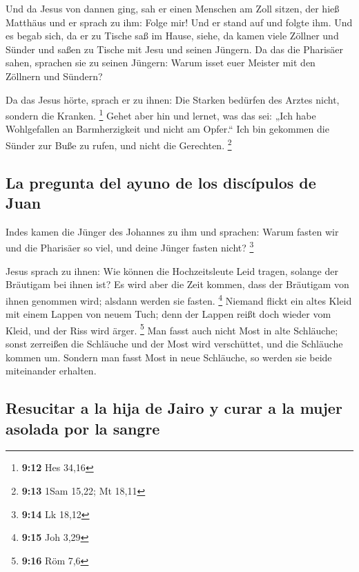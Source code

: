  Und da Jesus von dannen ging, sah er einen Menschen am
Zoll sitzen, der hieß Matthäus und er sprach zu ihm: Folge mir! Und er
stand auf und folgte ihm.  Und es begab sich, da er zu
Tische saß im Hause, siehe, da kamen viele Zöllner und Sünder und saßen
zu Tische mit Jesu und seinen Jüngern.  Da das die
Pharisäer sahen, sprachen sie zu seinen Jüngern: Warum isset euer
Meister mit den Zöllnern und Sündern?

 Da das Jesus hörte, sprach er zu ihnen: Die Starken
bedürfen des Arztes nicht, sondern die Kranken. \footnote{\textbf{9:12}
  Hes 34,16}  Gehet aber hin und lernet, was das sei:
„Ich habe Wohlgefallen an Barmherzigkeit und nicht am Opfer.`` Ich bin
gekommen die Sünder zur Buße zu rufen, und nicht die Gerechten.
\footnote{\textbf{9:13} 1Sam 15,22; Mt 18,11}

\hypertarget{la-pregunta-del-ayuno-de-los-discuxedpulos-de-juan}{%
\subsection{La pregunta del ayuno de los discípulos de
Juan}\label{la-pregunta-del-ayuno-de-los-discuxedpulos-de-juan}}

 Indes kamen die Jünger des Johannes zu ihm und sprachen:
Warum fasten wir und die Pharisäer so viel, und deine Jünger fasten
nicht? \footnote{\textbf{9:14} Lk 18,12}

 Jesus sprach zu ihnen: Wie können die Hochzeitsleute
Leid tragen, solange der Bräutigam bei ihnen ist? Es wird aber die Zeit
kommen, dass der Bräutigam von ihnen genommen wird; alsdann werden sie
fasten. \footnote{\textbf{9:15} Joh 3,29}  Niemand flickt
ein altes Kleid mit einem Lappen von neuem Tuch; denn der Lappen reißt
doch wieder vom Kleid, und der Riss wird ärger. \footnote{\textbf{9:16}
  Röm 7,6}  Man fasst auch nicht Most in alte Schläuche;
sonst zerreißen die Schläuche und der Most wird verschüttet, und die
Schläuche kommen um. Sondern man fasst Most in neue Schläuche, so werden
sie beide miteinander erhalten.

\hypertarget{resucitar-a-la-hija-de-jairo-y-curar-a-la-mujer-asolada-por-la-sangre}{%
\subsection{Resucitar a la hija de Jairo y curar a la mujer asolada por
la
sangre}\label{resucitar-a-la-hija-de-jairo-y-curar-a-la-mujer-asolada-por-la-sangre}}

